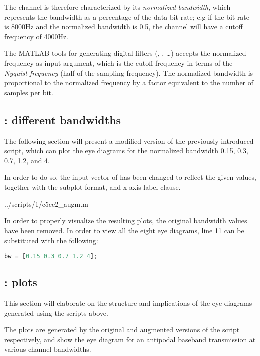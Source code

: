 The channel is therefore characterized by its \emph{normalized bandwidth}, which represents the bandwidth as a percentage of the data bit rate; e.g if the bit rate is 8000Hz and the normalized bandwidth is 0.5, the channel will have a cutoff frequency of 4000Hz.

The MATLAB tools for generating digital filters (, , \dots) accepts the normalized frequency as input argument, which is the cutoff frequency in terms of the \emph{Nyquist frequency} (half of the sampling frequency).
The normalized bandwidth is proportional to the normalized frequency by a factor equivalent to the number of samples per bit.


\subsection{: different bandwidths}
The following section will present a modified version of the previously introduced script, which can plot the eye diagrams for the normalized bandwidth 0.15, 0.3, 0.7, 1.2, and 4.

In order to do so, the input vector of  has been changed to reflect the given values, together with the subplot format, and x-axis label clause.

\begin{lstinputlisting}[language=Octave]{../scripts/1/c5ce2_augm.m}
\end{lstinputlisting}

In order to properly visualize the resulting plots, the original bandwidth values have been removed.
In order to view all the eight eye diagrams, line 11 can be substituted with the following:

\begin{lstlisting}[language=Octave]
    bw = [0.15 0.3 0.7 1.2 4];
\end{lstlisting}


\subsection{: plots}
This section will elaborate on the structure and implications of the eye diagrams generated using the scripts above.

The plots are generated by the original and augmented versions of the script respectively, and show the eye diagram for an antipodal baseband transmission at various channel bandwidths.


